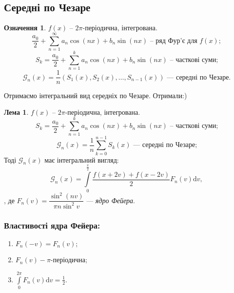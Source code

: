 \documentclass[a4paper]{scrartcl}
\theoremstyle{definition}
\newtheorem*{defo}{Означення}
\newtheorem*{lemme}{Лема}
\theoremstyle{remark}
\theoremstyle{definition}
\theoremstyle{definition}
\begin{document}
\subsection{Середні по Чезаре}
\begin{defo}
$f(x)$ -- $2\pi$-періодична, інтегрована.
$$
\frac{a_0}{2} +  \sum\limits_{n =1}^{\infty}{ a_n\cos{(nx)} + b_n \sin{(nx)}} \text{ -- ряд Фур'є для } f(x);
$$
$$
S_k = \frac{a_0}{2} +  \sum\limits_{n =1}^{k}{ a_n\cos{(nx)} + b_n \sin{(nx)}} \text{ -- часткові суми;}
$$
$$
\mathcal{G}_n(x) = \frac{1}{n}(S_1(x), S_2(x), \dots, S_{n-1}(x)) \textit{ --- середні по Чезаре.}
$$
\end{defo}
Отримаємо інтегральний вид середніх по Чезаре. Отримали:)
\begin{lemme} $f(x)$ -- $2\pi$-періодична, інтегрована.
  $$
  S_k = \frac{a_0}{2} +  \sum\limits_{n =1}^{k}{ a_n\cos{(nx)} + b_n \sin{(nx)}} \text{ -- часткові суми;}
  $$
  $$
  \mathcal{G}_n(x) = \frac{1}{n}  \sum\limits_{k = 0}^{n-1}{ S_k (x)}  \text{ --- середні по Чезаре;}
  $$
  Тоді  $\mathcal{G}_n(x) $ має інтегральний вигляд:
  $$
  \mathcal{G}_n(x) = \int\limits_{0}^{ \frac{\pi}{2} }{ \frac{f(x  + 2 v) + f(x - 2v)}{2} F_n(v) \mathrm{d} v} ,
  $$
  , де $F_n (v) = \dfrac{\sin^2 (nv)}{\pi n \sin^2 v} $ --- \textit{ядро Фейера}.
\end{lemme}
\subsubsection*{Властивості ядра Фейера:}
\begin{enumerate}
  \item $F_n (-v) = F_n (v)$;
  \item $F_n (v) - \pi$-періодична;
  \item $\displaystyle  \int\limits_{0}^{2\pi}{F_n (v) \mathrm{d} v} = \frac{1}{2} $.
\end{enumerate}
\end{document}
